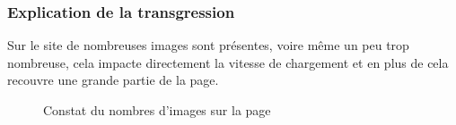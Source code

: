 \documentclass{article}[12pt]
\begin{document}
   \subsubsection*{Explication de la transgression}
   Sur le site de nombreuses images sont présentes, voire même un peu trop nombreuse, cela impacte directement la vitesse de chargement et en plus de cela recouvre une grande partie de la page.
   \begin{figure}[H]
   	\centering
   	\caption{Constat du nombres d'images sur la page}
   \end{figure}
\end{document}
